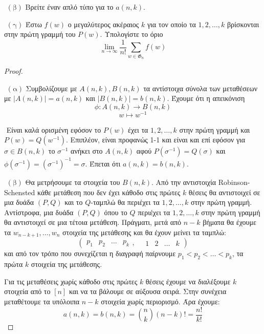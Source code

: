 \documentclass[oneside,a4paper]{article}
\newcommand {\tl}{\textlatin}
\begin{document}
$ $\newline
$(\text{β} )$ Βρείτε έναν απλό τύπο για το $a(n,k)$.

$ $\newline
$(\text{γ} )$ Έστω $f(w)$ ο μεγαλύτερος ακέραιος $k$ για τον οποίο τα $1,2,\ldots,k$ βρίσκονται στην πρώτη γραμμή του $P(w)$. Υπολογίστε το όριο $$\lim_{n \to \infty} \frac{1}{n!} \sum\limits_{w\in \mathfrak{G}_n} f(w) $$


\vspace*{1cm}
\begin{proof} $ $

    $ $\newline
    $(\text{α} )$ Συμβολίζουμε με $A(n,k), B(n,k)$ τα αντίστοιχα σύνολα των μεταθέσεων με $|A(n,k)|=a(n,k)$ και $|B(n,k)| = b(n,k)$. Έχουμε ότι η απεικόνιση
    $$\phi : A(n,k) \longrightarrow B(n,k)$$
    $$w \longmapsto w^{-1}$$
    
    $ $\newline
    Είναι καλά ορισμένη εφόσον το $P(w)$ έχει τα $1,2,\ldots,k$ στην πρώτη γραμμή και $P(w) = Q(w^{-1})$. Επιπλέον, είναι προφανώς 1-1 και είναι και επί εφόσον για $\sigma \in B(n,k)$ το $\sigma^{-1}$ ανήκει στο $A(n,k)$ αφού $P(\sigma^{-1}) = Q(\sigma)$ και $\phi (\sigma^{-1}) = \left(\sigma^{-1}\right)^{-1} = \sigma$. Έπεται ότι $a(n,k) = b(n,k)$.

    $ $\newline
    $(\text{β} )$ Θα μετρήσουμε τα στοιχεία του $B(n,k)$. Από την αντιστοιχία \tl{Robinson-Schensted} κάθε μετάθεση που δεν έχει κάθοδο στις πρώτες $k$ θέσεις θα αντιστοιχεί σε μια δυάδα $(P,Q)$ και το $Q$-ταμπλώ θα περιέχει τα $1,2,\ldots,k$ στην πρώτη γραμμή. Αντίστροφα, μια δυάδα $(P,Q)$ όπου το $Q$ περιέχει τα $1,2,\ldots,k$ στην πρώτη γραμμή θα αντιστοιχεί σε μια τέτοια μετάθεση. Πράγματι, μετά από $n-k$ βήματα θα έχουμε τα $w_{n-k + 1}, \ldots , w_n$ στοιχεία της μετάθεσης και θα έχουν μείνει τα ταμπλώ: $$\left( \begin{matrix} p_1 & p_2 & \ldots & p_k \end{matrix}, \quad \begin{matrix} 1 & 2 & \ldots & k \end{matrix}\right)$$ και από τον τρόπο που συνεχίζεται η διαγραφή παίρνουμε $p_1 < p_2 < \ldots < p_k$, τα πρώτα $k$ στοιχεία της μετάθεσης.

    $ $\newline Για τις μεταθέσεις χωρίς κάθοδο στις πρώτες $k$ θέσεις έχουμε να διαλέξουμε $k$ στοιχεία από το $[n]$ και να τα βάλουμε σε αύξουσα σειρά. Στην συνέχεια μεταθέτουμε τα υπόλοιπα $n-k$ στοιχεία χωρίς περιορισμό. Άρα έχουμε: $$a(n,k) = b(n,k) = \binom{n}{k} (n-k)! = \frac{n!}{k!}$$


\end{proof}
\end{document}
